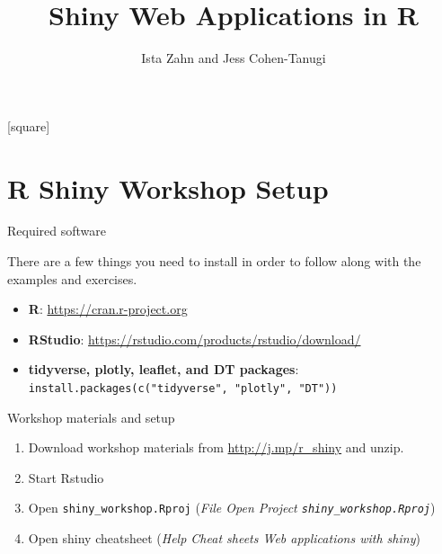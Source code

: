 \documentclass[
  12pt,
  ignorenonframetext,
]{beamer}
\title{Shiny Web Applications in R}
\author{Ista Zahn and Jess Cohen-Tanugi}
\date{}
\providecommand{\tightlist}{%
  \setlength{\itemsep}{0pt}\setlength{\parskip}{0pt}}
\begin{document}
\frame{\titlepage}

[square]

\begin{frame}
  \tableofcontents[hideallsubsections]
\end{frame}
\hypertarget{r-shiny-workshop-setup}{%
\section{R Shiny Workshop Setup}\label{r-shiny-workshop-setup}}

\begin{frame}[fragile]{Required software}
\protect\hypertarget{required-software}{}

There are a few things you need to install in order to follow along with
the examples and exercises.

\begin{itemize}
\tightlist
\item
  \textbf{R}: \url{https://cran.r-project.org}
\item
  \textbf{RStudio}: \url{https://rstudio.com/products/rstudio/download/}
\item
  \textbf{tidyverse, plotly, leaflet, and DT packages}:
  \newline \texttt{install.packages(c("tidyverse",\ "plotly",\ "DT"))}
\end{itemize}

\end{frame}

\begin{frame}[fragile]{Workshop materials and setup}
\protect\hypertarget{workshop-materials-and-setup}{}

\begin{enumerate}
\tightlist
\item
  Download workshop materials from \url{http://j.mp/r_shiny} and unzip.
\item
  Start Rstudio
\item
  Open \texttt{shiny\_workshop.Rproj} (\emph{File \rightarrow Open
  Project \rightarrow \texttt{shiny\_workshop.Rproj}})
\item
  Open shiny cheatsheet (\emph{Help \rightarrow Cheat sheets
  \rightarrow Web applications with shiny})
\end{enumerate}

\end{frame}
\end{document}
